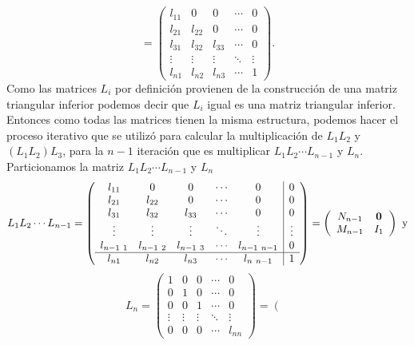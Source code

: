\documentclass[11pt,letterpaper]{article}
\begin{document}
\begin{enumerate}
\begin{equation*}
\end{equation*}
\begin{equation*}
=\left( \begin{array}{ccccc}
l_{11}&0 & 0 & \cdots &0\\
l_{21}&l_{22}& 0 & \cdots & 0\\
l_{31}&l_{32}&l_{33}& \cdots & 0\\
\vdots & \vdots & \vdots & \ddots & \vdots\\
l_{n1}&l_{n2}&l_{n3}& \cdots &1
\end{array}\right).
\end{equation*}
Como las matrices $L_i$ por definición  provienen de la construcción de una matriz triangular inferior podemos decir que $L_i$ igual es una matriz triangular inferior. Entonces como todas las matrices tienen la misma estructura, podemos hacer el proceso iterativo que se utilizó para calcular la multiplicación de $L_1L_2$ y $(L_1L_2)L_3$, para la $n-1$ iteración  que es multiplicar $L_1L_2\cdots L_{n-1}$ y $L_n$.\\
Particionamos la matriz $L_1L_2\cdots L_{n-1}$ y $L_n$
\begin{equation*}
L_1L_2\cdots L_{n-1}= \left( \begin{array}{ccccc|c}
l_{11}&0 & 0 & \cdots &0&0\\
l_{21}&l_{22}& 0 & \cdots&0 & 0\\
l_{31}&l_{32}&l_{33}& \cdots&0 & 0\\
\vdots & \vdots & \vdots & \ddots & \vdots &\vdots\\
l_{n-1 \ 1} & l_{n-1\ 2} & l_{n-1\ 3} &\cdots& l_{n-1 \ n-1} &0\\ \hline
l_{n1}&l_{n2}&l_{n3}& \cdots &l_{n\ n-1}&1
\end{array}\right)=\left( \begin{array}{cc}
N_{n-1}& \bf{0}\\
M_{n-1}&I_{1}\\
\end{array} \right)\ \text{y} 
\end{equation*}
\begin{equation*}
L_n=\left( \begin{array}{cccc|c}
1&0 & 0 & \cdots &0\\
0&1& 0 & \cdots & 0\\
0&0& 1& \cdots & 0\\
\vdots & \vdots & \vdots & \ddots & \vdots\\ \hline
0&0&0& \cdots & l_{nn}
\end{array}\right)=\left( \begin{array}{cc}

\end{array}
\end{equation*}
\end{enumerate}
\end{document}
